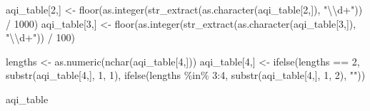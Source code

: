 \documentclass[
]{article}
\newenvironment{Shaded}{}{}
\newcommand{\DecValTok}[1]{\textcolor[rgb]{0.00,0.00,0.80}{#1}}
\newcommand{\FunctionTok}[1]{#1}
\newcommand{\NormalTok}[1]{#1}
\newcommand{\OtherTok}[1]{\textcolor[rgb]{1.00,0.25,0.00}{#1}}
\newcommand{\SpecialCharTok}[1]{\textcolor[rgb]{0.00,0.50,0.50}{#1}}
\newcommand{\StringTok}[1]{\textcolor[rgb]{0.01,0.42,0.03}{#1}}
\begin{document}
\begin{Shaded}
\begin{Highlighting}[]
\NormalTok{aqi\_table[}\DecValTok{2}\NormalTok{,] }\OtherTok{\textless{}{-}} 
  \FunctionTok{floor}\NormalTok{(}\FunctionTok{as.integer}\NormalTok{(}\FunctionTok{str\_extract}\NormalTok{(}\FunctionTok{as.character}\NormalTok{(aqi\_table[}\DecValTok{2}\NormalTok{,]), }\StringTok{"}\SpecialCharTok{\textbackslash{}\textbackslash{}}\StringTok{d+"}\NormalTok{)) }\SpecialCharTok{/} \DecValTok{1000}\NormalTok{)}
\NormalTok{aqi\_table[}\DecValTok{3}\NormalTok{,] }\OtherTok{\textless{}{-}} 
  \FunctionTok{floor}\NormalTok{(}\FunctionTok{as.integer}\NormalTok{(}\FunctionTok{str\_extract}\NormalTok{(}\FunctionTok{as.character}\NormalTok{(aqi\_table[}\DecValTok{3}\NormalTok{,]), }\StringTok{"}\SpecialCharTok{\textbackslash{}\textbackslash{}}\StringTok{d+"}\NormalTok{)) }\SpecialCharTok{/} \DecValTok{100}\NormalTok{)}

\NormalTok{lengths }\OtherTok{\textless{}{-}} \FunctionTok{as.numeric}\NormalTok{(}\FunctionTok{nchar}\NormalTok{(aqi\_table[}\DecValTok{4}\NormalTok{,]))}
\NormalTok{aqi\_table[}\DecValTok{4}\NormalTok{,] }\OtherTok{\textless{}{-}} 
  \FunctionTok{ifelse}\NormalTok{(lengths }\SpecialCharTok{==} \DecValTok{2}\NormalTok{, }\FunctionTok{substr}\NormalTok{(aqi\_table[}\DecValTok{4}\NormalTok{,], }\DecValTok{1}\NormalTok{, }\DecValTok{1}\NormalTok{), }
  \FunctionTok{ifelse}\NormalTok{(lengths }\SpecialCharTok{\%in\%} \DecValTok{3}\SpecialCharTok{:}\DecValTok{4}\NormalTok{, }\FunctionTok{substr}\NormalTok{(aqi\_table[}\DecValTok{4}\NormalTok{,], }\DecValTok{1}\NormalTok{, }\DecValTok{2}\NormalTok{), }\StringTok{""}\NormalTok{))}

\NormalTok{aqi\_table}
\end{Highlighting}
\end{Shaded}
\end{document}
